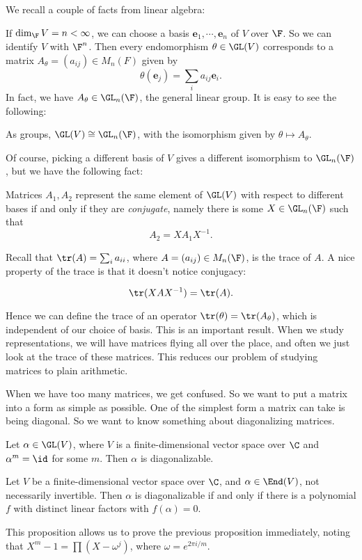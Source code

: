 \documentclass[a4paper]{article}
\begin{document}
We recall a couple of facts from linear algebra:

If $\dim_\F V = n < \infty$, we can choose a basis $\mathbf{e}_1, \cdots, \mathbf{e}_n$ of $V$ over $\F$. So we can identify $V$ with $\F^n$. Then every endomorphism $\theta \in \GL(V)$ corresponds to a matrix $A_\theta = (a_{ij}) \in M_n(F)$ given by
\[
  \theta(\mathbf{e}_j) = \sum_i a_{ij} \mathbf{e}_i.
\]
In fact, we have $A_\theta \in \GL_n(\F)$, the general linear group. It is easy to see the following:
\begin{prop}
  As groups, $\GL(V) \cong \GL_n(\F)$, with the isomorphism given by $\theta \mapsto A_\theta$.
\end{prop}

Of course, picking a different basis of $V$ gives a different isomorphism to $\GL_n(\F)$, but we have the following fact:
\begin{prop}
  Matrices $A_1, A_2$ represent the same element of $\GL(V)$ with respect to different bases if and only if they are \emph{conjugate}, namely there is some $X \in \GL_n(\F)$ such that
  \[
    A_2 = XA_1 X^{-1}.
  \]
\end{prop}

Recall that $\tr(A) = \sum_i a_{ii}$, where $A = (a_{ij}) \in M_n(\F)$, is the trace of $A$. A nice property of the trace is that it doesn't notice conjugacy:
\begin{prop}
  \[
    \tr(XAX^{-1}) = \tr (A).
  \]
\end{prop}

Hence we can define the trace of an operator $\tr(\theta) = \tr(A_\theta)$, which is independent of our choice of basis. This is an important result. When we study representations, we will have matrices flying all over the place, and often we just look at the trace of these matrices. This reduces our problem of studying matrices to plain arithmetic.

When we have too many matrices, we get confused. So we want to put a matrix into a form as simple as possible. One of the simplest form a matrix can take is being diagonal. So we want to know something about diagonalizing matrices.

\begin{prop}
  Let $\alpha \in \GL(V)$, where $V$ is a finite-dimensional vector space over $\C$ and $\alpha^m = \id$ for some $m$. Then $\alpha$ is diagonalizable.
\end{prop}

\begin{prop}
  Let $V$ be a finite-dimensional vector space over $\C$, and $\alpha \in \End(V)$, not necessarily invertible. Then $\alpha$ is diagonalizable if and only if there is a polynomial $f$ with distinct linear factors with $f(\alpha) = 0$.
\end{prop}
This proposition allows us to prove the previous proposition immediately, noting that $X^m - 1 = \prod(X - \omega^j)$, where $\omega = e^{2\pi i/m}$.
\end{document}
